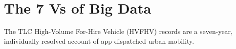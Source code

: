 %

\section{The 7 Vs of Big Data}
\label{sec:7vs}

The TLC High-Volume For-Hire Vehicle (HVFHV) records are a seven-year,
individually resolved account of app-dispatched urban mobility.

